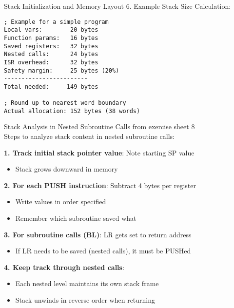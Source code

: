 \begin{KR}{Stack Initialization and Memory Layout}
6. Example Stack Size Calculation:
\begin{lstlisting}[language=armasm, style=basesmol]
; Example for a simple program
Local vars:        20 bytes
Function params:   16 bytes
Saved registers:   32 bytes
Nested calls:      24 bytes
ISR overhead:      32 bytes
Safety margin:     25 bytes (20%)
------------------------
Total needed:     149 bytes

; Round up to nearest word boundary
Actual allocation: 152 bytes (38 words)
\end{lstlisting}
\end{KR}



\begin{KR}{Stack Analysis in Nested Subroutine Calls} from exercise sheet 8\\
Steps to analyze stack content in nested subroutine calls:

\textbf{1. Track initial stack pointer value}: Note starting SP value
\begin{itemize}
  \item Stack grows downward in memory
\end{itemize}

\textbf{2. For each PUSH instruction}: Subtract 4 bytes per register
\begin{itemize}
  \item Write values in order specified
  \item Remember which subroutine saved what
\end{itemize}

\textbf{3. For subroutine calls (BL)}: LR gets set to return address
\begin{itemize}
  \item If LR needs to be saved (nested calls), it must be PUSHed
\end{itemize}

\textbf{4. Keep track through nested calls}:
\begin{itemize}
  \item Each nested level maintains its own stack frame
  \item Stack unwinds in reverse order when returning
\end{itemize}
\end{KR}

